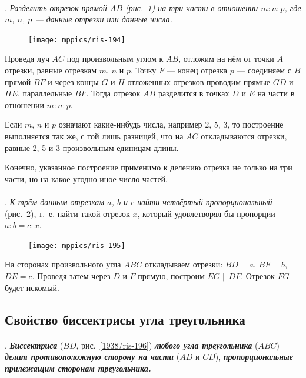 \documentclass[oneside]{book}
\begin{document}
\paragraph{}\label{1938/184}
.
\emph{Разделить отрезок прямой $AB$ \emph{(рис.~\ref{1938/ris-194})} на три части в отношении $m:n:p$, где $m$, $n$, $p$ — данные отрезки или данные числа.}

\begin{figure}[h!]
\centering
\texttt{[image: mppics/ris-194]}
\caption{}\label{1938/ris-194}
\end{figure}

Проведя луч $AC$ под произвольным углом к $AB$, отложим на нём от точки $A$ отрезки, равные отрезкам $m$, $n$ и $p$.
Точку $F$ — конец отрезка $p$ — соединяем с $B$ прямой $BF$ и через концы $G$ и $H$ отложенных отрезков проводим прямые $GD$ и $HE$, параллельные $BF$.
Тогда отрезок $AB$ разделится в точках $D$ и $E$ на части в отношении $m:n:p$.

Если $m$, $n$ и $p$ означают какие-нибудь числа, например 2, 5, 3, то построение выполняется так же, с той лишь разницей, что на $AC$ откладываются отрезки, равные 2, 5 и 3 произвольным единицам длины.

Конечно, указанное построение применимо к делению отрезка не только на три части, но на какое угодно иное число частей.

\paragraph{}\label{1938/185}
.
\emph{К трём данным отрезкам $a$, $b$ и $c$ найти четвёртый пропорциональный} (рис.~\ref{1938/ris-195}), т.~е.
найти такой отрезок $x$, который удовлетворял бы пропорции $a:b=c:x$.

\begin{figure}[h!]
\centering
\texttt{[image: mppics/ris-195]}
\caption{}\label{1938/ris-195}
\end{figure}

На сторонах произвольного угла $ABC$ откладываем отрезки:
$BD=a$, $BF=b$, $DE=c$.
Проведя затем через $D$ и $F$ прямую, построим $EG\parallel DF$.
Отрезок $FG$ будет искомый.

\subsection*{Свойство биссектрисы угла треугольника}

\paragraph{}\label{1938/186}
.
\textbf{\emph{Биссектриса}} ($BD$, рис.~\ref{1938/ris-196}) \textbf{\emph{любого угла треугольника}} ($ABC$) \textbf{\emph{делит противоположную сторону на части}} ($AD$ и $CD$), \textbf{\emph{пропорциональные прилежащим сторонам треугольника.}}
\end{document}
